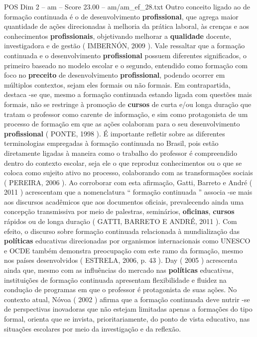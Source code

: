 \begin{textsample}{POS Dim 2 – am – Score 23.00 – am/am\_ef\_28.txt}
Outro conceito ligado ao de formação continuada é o de desenvolvimento \textbf{profissional}, que agrega maior quantidade de ações direcionadas à melhoria da prática laboral, às crenças e aos conhecimentos \textbf{profissionais}, objetivando melhorar a \textbf{qualidade} docente, investigadora e de gestão ( IMBERNÓN, 2009 ).
Vale ressaltar que a formação continuada e o desenvolvimento \textbf{profissional} possuem diferentes significados, o primeiro baseado no modelo escolar e o segundo, entendido como formação com foco no \textbf{preceito} de desenvolvimento \textbf{profissional}, podendo ocorrer em múltiplos contextos, sejam eles formais ou não formais.
Em contrapartida, destaca -se que, mesmo a formação continuada estando ligada com questões mais formais, não se restringe à promoção de \textbf{cursos} de curta e/ou longa duração que tratam o professor como carente de informação, e sim como protagonista de um processo de formação em que as ações colaboram para o seu desenvolvimento \textbf{profissional} ( PONTE, 1998 ).
É importante refletir sobre as diferentes terminologias empregadas à formação continuada no Brasil, pois estão diretamente ligadas à maneira como o trabalho do professor é compreendido dentro do contexto escolar, seja ele o que reproduz conhecimentos ou o que se coloca como sujeito ativo no processo, colaborando com as transformações sociais ( PEREIRA, 2006 ).
Ao corroborar com esta afirmação, Gatti, Barreto e André ( 2011 ) acrescentam que a nomenclatura “ formação continuada ” associa -se mais aos discursos acadêmicos que aos documentos oficiais, prevalecendo ainda uma concepção transmissiva por meio de palestras, seminários, \textbf{oficinas}, \textbf{cursos} rápidos ou de longa duração ( GATTI, BARRETO E ANDRÉ, 2011 ).
Com efeito, o discurso sobre formação continuada relacionada à mundialização das \textbf{políticas} educativas direcionadas por organismos internacionais como UNESCO e OCDE também demonstra preocupação com este ramo da formação, mesmo nos países desenvolvidos ( ESTRELA, 2006, p. 43 ).
Day ( 2005 ) acrescenta ainda que, mesmo com as influências do mercado nas \textbf{políticas} educativas, instituições de formação continuada apresentam flexibilidade e fluidez na condução de programas em que o professor é protagonista de suas ações.
No contexto atual, Nóvoa ( 2002 ) afirma que a formação continuada deve nutrir -se de perspectivas inovadoras que não estejam limitadas apenas a formações do tipo formal, orienta que se invista, prioritariamente, do ponto de vista educativo, nas situações escolares por meio da investigação e da reflexão.

\end{textsample}
